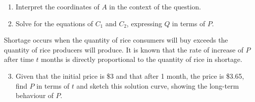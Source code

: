 \documentclass{echw}
\begin{document}
        \begin{center}
        \end{center}

        \begin{enumerate}
            \item Interpret the coordinates of $A$ in the context of the question.
            \item Solve for the equations of $C_1$ and $C_2$, expressing $Q$ in terms of $P$.
        \end{enumerate}

        Shortage occurs when the quantity of rice consumers will buy exceeds the quantity of rice producers will produce. It is known that the rate of increase of $P$ after time $t$ months is directly proportional to the quantity of rice in shortage.

        \begin{enumerate}
            \setcounter{enumi}{2}
            \item Given that the initial price is \$3 and that after 1 month, the price is \$3.65, find $P$ in terms of $t$ and sketch this solution curve, showing the long-term behaviour of $P$.
        \end{enumerate}
\end{document}
